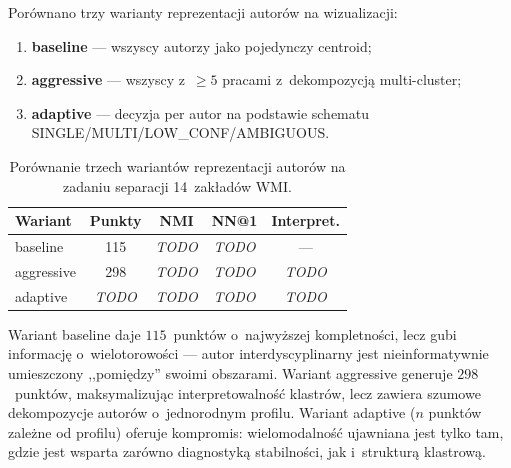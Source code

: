 \documentclass[a4paper,11pt,twocolumn]{article}
\begin{document}
Porównano trzy warianty reprezentacji autorów na wizualizacji:
\begin{enumerate}
  \item \textbf{baseline} --- wszyscy autorzy jako pojedynczy centroid;
  \item \textbf{aggressive} --- wszyscy z~$\geq 5$ pracami z~dekompozycją
        multi-cluster;
  \item \textbf{adaptive} --- decyzja per autor na podstawie schematu
        SINGLE/MULTI/LOW\_CONF/AMBIGUOUS.
\end{enumerate}

\begin{table}[t]
\centering
\caption{Porównanie trzech wariantów reprezentacji autorów
na zadaniu separacji 14~zakładów WMI.}
\label{tab:variants}
\small
\begin{tabular}{@{}lcccc@{}}
\toprule
Wariant & Punkty & NMI & NN@1 & Interpret. \\
\midrule
baseline   & 115 & \textit{TODO} & \textit{TODO} & --- \\
aggressive & 298 & \textit{TODO} & \textit{TODO} & \textit{TODO} \\
adaptive   & \textit{TODO} & \textit{TODO} & \textit{TODO} & \textit{TODO} \\
\bottomrule
\end{tabular}
\end{table}

Wariant baseline daje $115$~punktów o~najwyższej kompletności, lecz
gubi informację o~wielotorowości --- autor interdyscyplinarny jest
nieinformatywnie umieszczony ,,pomiędzy'' swoimi obszarami. Wariant
aggressive generuje $298$~punktów, maksymalizując interpretowalność
klastrów, lecz zawiera szumowe dekompozycje autorów o~jednorodnym
profilu. Wariant adaptive ($n$ punktów zależne od profilu) oferuje
kompromis: wielomodalność ujawniana jest tylko tam, gdzie jest
wsparta zarówno diagnostyką stabilności, jak i~strukturą klastrową.

\end{document}
